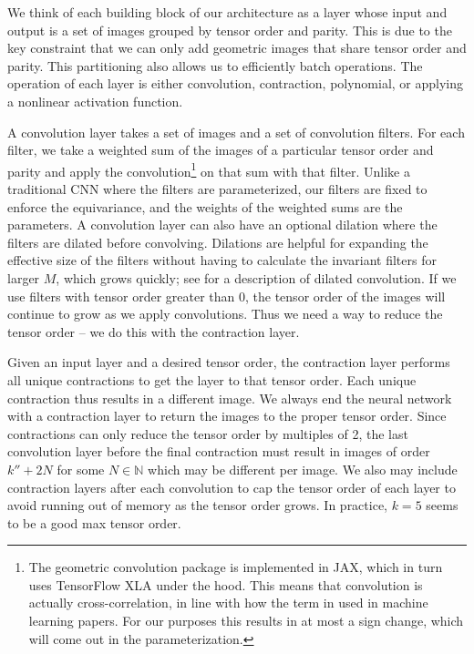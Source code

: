 \documentclass{article}
\theoremstyle{definition}
\newcommand{\tensorname}[2]{{#1}_{(#2)}}
\newcommand{\tensor}[2]{$\tensorname{#1}{#2}$-tensor}
\begin{document}

We think of each building block of our architecture as a layer whose input and output is a set of images grouped by tensor order and parity. This is due to the key constraint that we can only add geometric images that share tensor order and parity. This partitioning also allows us to efficiently batch operations. The operation of each layer is either convolution, contraction, polynomial, or applying a nonlinear activation function.

A convolution layer takes a set of images and a set of convolution filters. For each filter, we take a weighted sum of the images of a particular tensor order and parity and apply the convolution\footnote{The geometric convolution package is implemented in JAX, which in turn uses TensorFlow XLA under the hood. This means that convolution is actually cross-correlation, in line with how the term in used in machine learning papers. For our purposes this results in at most a sign change, which will come out in the parameterization.} on that sum with that filter. Unlike a traditional CNN where the filters are parameterized, our filters are fixed to enforce the equivariance, and the weights of the weighted sums are the parameters. A convolution layer can also have an optional dilation where the filters are dilated before convolving. Dilations are helpful for expanding the effective size of the filters without having to calculate the invariant filters for larger $M$, which grows quickly; see \cite{convolution_math} for a description of dilated convolution. If we use filters with tensor order greater than 0, the tensor order of the images will continue to grow as we apply convolutions. Thus we need a way to reduce the tensor order -- we do this with the contraction layer.

Given an input layer and a desired tensor order, the contraction layer performs all unique contractions to get the layer to that tensor order. Each unique contraction thus results in a different image. We always end the neural network with a contraction layer to return the images to the proper tensor order. Since contractions can only reduce the tensor order by multiples of 2, the last convolution layer before the final contraction must result in images of order $k'' + 2N$ for some $N \in \mathbb{N}$ which may be different per image. We also may include contraction layers after each convolution to cap the tensor order of each layer to avoid running out of memory as the tensor order grows. In practice, $k=5$ seems to be a good max tensor order.
\end{document}
